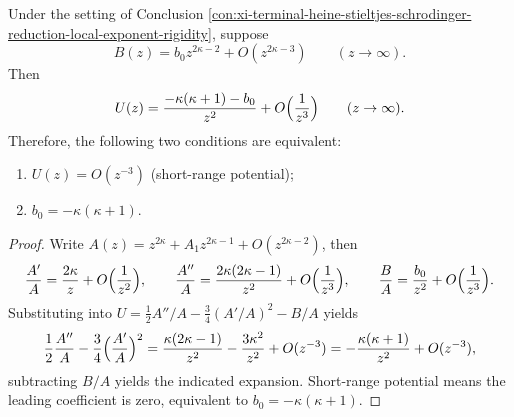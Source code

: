 \begin{conclusion}\label{con:xi-terminal-heine-stieltjes-short-range-tail-vanish}
Under the setting of Conclusion \ref{con:xi-terminal-heine-stieltjes-schrodinger-reduction-local-exponent-rigidity}, suppose
\[
B(z)=b_0 z^{2\kappa-2}+O(z^{2\kappa-3})\qquad(z\to\infty).
\]
Then
\[
U(z)=\frac{-\kappa(\kappa+1)-b_0}{z^{2}}+O\Bigl(\frac{1}{z^{3}}\Bigr)\qquad(z\to\infty).
\]
Therefore, the following two conditions are equivalent:
\begin{enumerate}
  \item \(U(z)=O(z^{-3})\) (short-range potential);
  \item \(b_0=-\kappa(\kappa+1)\).
\end{enumerate}
\end{conclusion}
\begin{proof}
Write
\(
A(z)=z^{2\kappa}+A_1 z^{2\kappa-1}+O(z^{2\kappa-2})
\), then
\[
\frac{A'}{A}=\frac{2\kappa}{z}+O\Bigl(\frac{1}{z^{2}}\Bigr),\qquad
\frac{A''}{A}=\frac{2\kappa(2\kappa-1)}{z^{2}}+O\Bigl(\frac{1}{z^{3}}\Bigr),\qquad
\frac{B}{A}=\frac{b_0}{z^{2}}+O\Bigl(\frac{1}{z^{3}}\Bigr).
\]
Substituting into
\(
U=\tfrac12 A''/A-\tfrac34(A'/A)^2-B/A
\)
yields
\[
\frac12\frac{A''}{A}-\frac34\Bigl(\frac{A'}{A}\Bigr)^2
=\frac{\kappa(2\kappa-1)}{z^{2}}-\frac{3\kappa^{2}}{z^{2}}+O(z^{-3})
=-\frac{\kappa(\kappa+1)}{z^{2}}+O(z^{-3}),
\]
subtracting \(B/A\) yields the indicated expansion.
Short-range potential means the leading coefficient is zero, equivalent to \(b_0=-\kappa(\kappa+1)\).
\end{proof}

